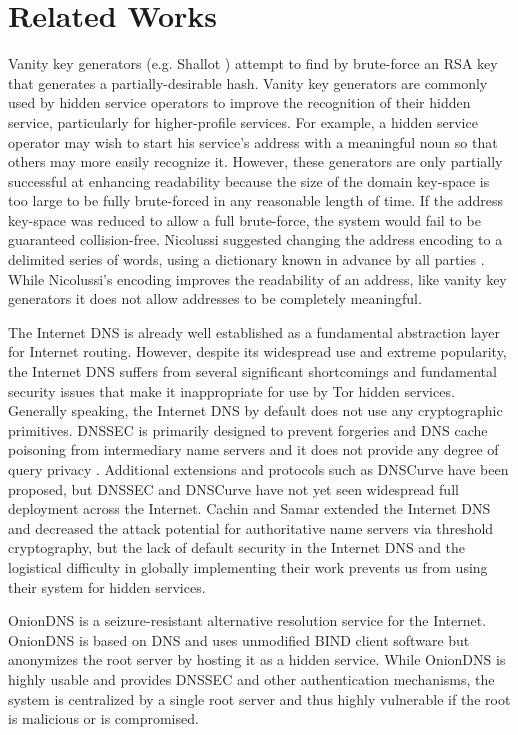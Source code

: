 \documentclass[USenglish,oneside,twocolumn]{article}
\begin{document}
\section{Related Works}
\label{sec:RelatedWorks}

Vanity key generators (e.g. Shallot \cite{KatmagicShallot}) attempt to find by brute-force an RSA key that generates a partially-desirable hash. Vanity key generators are commonly used by hidden service operators to improve the recognition of their hidden service, particularly for higher-profile services. For example, a hidden service operator may wish to start his service's address with a meaningful noun so that others may more easily recognize it. However, these generators are only partially successful at enhancing readability because the size of the domain key-space is too large to be fully brute-forced in any reasonable length of time. If the address key-space was reduced to allow a full brute-force, the system would fail to be guaranteed collision-free. Nicolussi suggested changing the address encoding to a delimited series of words, using a dictionary known in advance by all parties \cite{nicolussi2011human}. While Nicolussi's encoding improves the readability of an address, like vanity key generators it does not allow addresses to be completely meaningful.

The Internet DNS is already well established as a fundamental abstraction layer for Internet routing. However, despite its widespread use and extreme popularity, the Internet DNS suffers from several significant shortcomings and fundamental security issues that make it inappropriate for use by Tor hidden services. Generally speaking, the Internet DNS by default does not use any cryptographic primitives. DNSSEC is primarily designed to prevent forgeries and DNS cache poisoning from intermediary name servers and it does not provide any degree of query privacy \cite{wachs2014censorship}. Additional extensions and protocols such as DNSCurve \cite{bernstein2009dnscurve} have been proposed, but DNSSEC and DNSCurve have not yet seen widespread full deployment across the Internet. Cachin and Samar \cite{cachin2004secure} extended the Internet DNS and decreased the attack potential for authoritative name servers via threshold cryptography, but the lack of default security in the Internet DNS and the logistical difficulty in globally implementing their work prevents us from using their system for hidden services.

OnionDNS \cite{scaife2015oniondns} is a seizure-resistant alternative resolution service for the Internet. OnionDNS is based on DNS and uses unmodified BIND client software but anonymizes the root server by hosting it as a hidden service. While OnionDNS is highly usable and provides DNSSEC and other authentication mechanisms, the system is centralized by a single root server and thus highly vulnerable if the root is malicious or is compromised.
\end{document}
